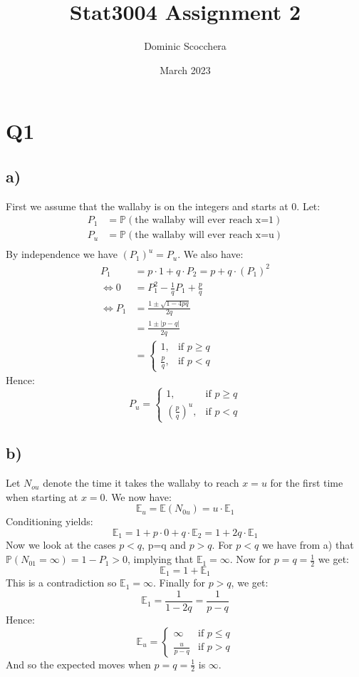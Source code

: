 \documentclass{article}
\title{Stat3004 Assignment 2}
\author{Dominic Scocchera}
\date{March 2023}
\begin{document}
\maketitle
\section*{Q1}
\subsection*{a)}
First we assume that the wallaby is on the integers and starts at 0. Let:
\begin{align*}
P_1&=\mathbb{P}(\text{the wallaby will ever reach x=1})\\
P_u&=\mathbb{P}(\text{the wallaby will ever reach x=u})\\
\end{align*}
By independence we have $(P_1)^u=P_u$. We also have:
\begin{align*}
P_1&=p\cdot1+q\cdot P_2=p+q\cdot(P_1)^2\\
\iff 0&=P_1^2-\frac{1}{q}P_1+\frac{p}{q}\\
\iff P_1&=\frac{1\pm\sqrt{1-4pq}}{2q}\\
&=\frac{1\pm|p-q|}{2q}\\
&=\begin{cases}
1, & \text{if }p\geq q\\
\frac{p}{q}, & \text{if }p<q
\end{cases}
\end{align*}
Hence:
$$P_u=\begin{cases}
1, & \text{if }p\geq q\\
(\frac{p}{q})^u, & \text{if }p<q
\end{cases}$$
\subsection*{b)}
Let $N_{ou}$ denote the time it takes the wallaby to reach $x=u$ for the first time when starting at $x=0$. We now have:
$$\mathbb{E}_u=\mathbb{E}(N_{0u})=u\cdot\mathbb{E}_1$$
Conditioning yields:
$$\mathbb{E}_1=1+p\cdot0+q\cdot\mathbb{E}_2=1+2q\cdot\mathbb{E}_1$$
Now we look at the cases $p<q$, p=q and $p>q$. For $p<q$ we have from a) that $\mathbb{P}(N_{01}=\infty)=1-P_1>0$, implying that $\mathbb{E}_1=\infty$.
\newline\newline
Now for $p=q=\frac{1}{2}$ we get:
$$\mathbb{E}_1=1+\mathbb{E}_1$$
This is a contradiction so $\mathbb{E}_1=\infty$.
\newline\newline
Finally for $p>q$, we get:
$$\mathbb{E}_1=\frac{1}{1-2q}=\frac{1}{p-q}$$
Hence:
$$\mathbb{E}_u=\begin{cases}
\infty & \text{if } p\leq q\\
\frac{u}{p-q} & \text{if } p>q
\end{cases}$$
And so the expected moves when $p=q=\frac{1}{2}$ is $\infty$.
\end{document}
